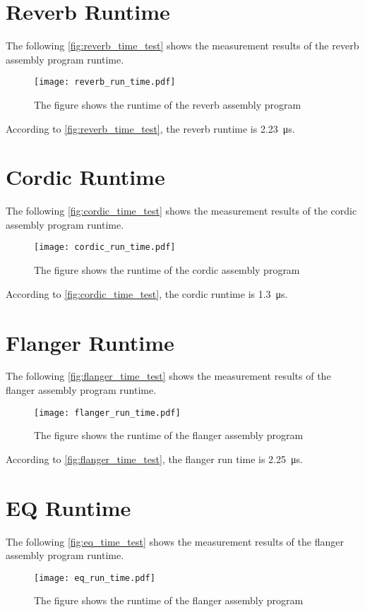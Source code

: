 \section*{Reverb Runtime}
The following \autoref{fig:reverb_time_test} shows the measurement results of the \gls{reverb} assembly program runtime.
\begin{figure}[H]
	\centering
		\texttt{[image: reverb\_run\_time.pdf]}
		\caption{The figure shows the runtime of the \gls{reverb} assembly program}
		\label{fig:reverb_time_test}
\end{figure}

According to \autoref{fig:reverb_time_test}, the \gls{reverb} runtime is \SI{2.23}{\micro\second}.

\section*{Cordic Runtime}
The following \autoref{fig:cordic_time_test} shows the measurement results of the cordic assembly program runtime.
\begin{figure}[H]
	\centering
		\texttt{[image: cordic\_run\_time.pdf]}
		\caption{The figure shows the runtime of the cordic assembly program}
		\label{fig:cordic_time_test}
\end{figure}

According to \autoref{fig:cordic_time_test}, the cordic runtime is \SI{1.3}{\micro\second}.

\section*{Flanger Runtime}
The following \autoref{fig:flanger_time_test} shows the measurement results of the flanger assembly program runtime.
\begin{figure}[H]
	\centering
		\texttt{[image: flanger\_run\_time.pdf]}
		\caption{The figure shows the runtime of the flanger assembly program}
		\label{fig:flanger_time_test}
\end{figure}

According to \autoref{fig:flanger_time_test}, the flanger run time is \SI{2.25}{\micro\second}.

\newpage

\section*{EQ Runtime}
The following \autoref{fig:eq_time_test} shows the measurement results of the flanger assembly program runtime.
\begin{figure}[H]
	\centering
		\texttt{[image: eq\_run\_time.pdf]}
		\caption{The figure shows the runtime of the flanger assembly program}
		\label{fig:eq_time_test}
\end{figure}

